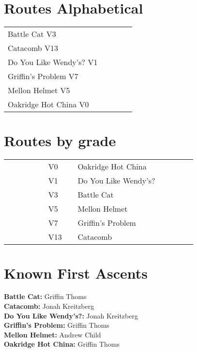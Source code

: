 \begin{flushleft}

\needspace{1.5cm}
\section{Routes Alphabetical}
\begin{center}
\begin{supertabular}{p{0.76\linewidth}p{0.08\linewidth}}
Battle Cat V3 & \pageref{rt:Battle Cat} \\
Catacomb V13 & \pageref{rt:Catacomb} \\
Do You Like Wendy's? V1 & \pageref{vr:Do You Like Wendy's?} \\
Griffin's Problem V7 & \pageref{rt:Griffin's Problem} \\
Mellon Helmet V5 & \pageref{rt:Mellon Helmet} \\
Oakridge Hot China V0 & \pageref{rt:Oakridge Hot China} \\
\end{supertabular}
\end{center}
\needspace{1.5cm}
\section{Routes by grade}
\begin{center}
\begin{supertabular}{p{0.18\linewidth}p{0.13\linewidth}p{0.45\linewidth}p{0.08\linewidth}}
 &V0&Oakridge Hot China & \pageref{rt:Oakridge Hot China} \\
 &V1&Do You Like Wendy's? & \pageref{vr:Do You Like Wendy's?} \\
 &V3&Battle Cat & \pageref{rt:Battle Cat} \\
 &V5&Mellon Helmet & \pageref{rt:Mellon Helmet} \\
 &V7&Griffin's Problem & \pageref{rt:Griffin's Problem} \\
 &V13&Catacomb & \pageref{rt:Catacomb} \\
\end{supertabular}
\end{center}
\section{Known First Ascents}
\textbf{Battle Cat:} Griffin Thoms\\
\textbf{Catacomb:} Jonah Kreitzberg\\
\textbf{Do You Like Wendy's?:} Jonah Kreitzberg\\
\textbf{Griffin's Problem:} Griffin Thoms\\
\textbf{Mellon Helmet:} Andrew Child\\
\textbf{Oakridge Hot China:} Griffin Thoms\\
\end{flushleft}
\onecolumn
\clearpage